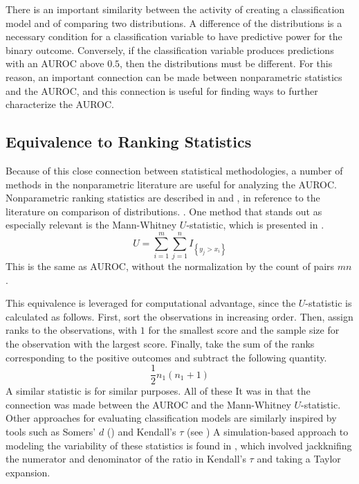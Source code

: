
There is an important similarity between the activity of creating a classification model and of comparing two distributions. 
% 
A difference of the distributions is a necessary condition for a classification variable to have predictive power for the binary outcome. 
Conversely, if the classification variable produces predictions with an AUROC above $0.5$, then the distributions must be different. 
% 
For this reason, an important connection can be made between nonparametric statistics and the AUROC, and this connection is useful for finding ways to further characterize the AUROC. 

% 





\subsection{Equivalence to Ranking Statistics}

Because of this close connection between statistical methodologies, a number of methods in the nonparametric literature are useful for analyzing the AUROC. 
Nonparametric ranking statistics are described in \citet{lehmann2006} and \citet{kendall1990}, in reference to the literature on comparison of distributions. .
One method that stands out as especially relevant is the 
Mann-Whitney $U$-statistic, which is presented in \citet{mannwhitney1947}. 
% 
\begin{equation}
    U = \sum_{i = 1}^{m} \sum_{j = 1}^{n} I_{\left\{ y_j > x_i \right\}}
\end{equation}
% 
This is the same as AUROC, without the normalization by the count of pairs $m n$.

This equivalence is leveraged for computational advantage, since the $U$-statistic is calculated as follows.
First, sort the observations in increasing order.
Then, assign ranks to the observations, with $1$ for the smallest score and the sample size for the observation with the largest score.
Finally, take the sum of the ranks corresponding to the positive outcomes and subtract the following quantity.
\begin{equation}
    \frac{1}{2} n_1(n_1 + 1)
\end{equation}
% 
A similar statistic is \citet{wilcoxon1945} for similar purposes.
All of these 
It was in 
\citet{bamber1975} that the connection was made between the AUROC and the Mann-Whitney $U$-statistic.
Other approaches for evaluating classification models are similarly inspired by tools such as
Somers' $d$ (\citet{somers1962}) and Kendall's $\tau$ (see \citet{kendall1990})
A simulation-based approach to modeling the variability of these statistics is found in \citet{newson2006}, which involved jackknifing the numerator and denominator of the ratio in Kendall's $\tau$ and taking a Taylor expansion. 

